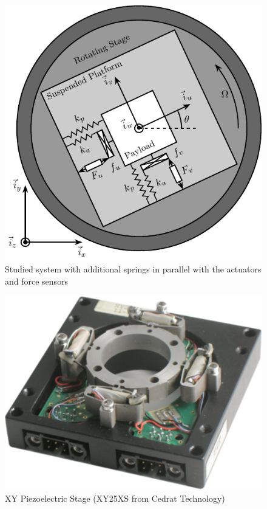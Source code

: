 \documentclass[10pt]{iopart}
\begin{document}
\begin{figure}[htbp]
\centering
\includegraphics[width=\linewidth]{figs/fig12.pdf}
\caption{\label{fig:system_parallel_springs}Studied system with additional springs in parallel with the actuators and force sensors}
\end{figure}


\begin{figure}[htbp]
\centering
\includegraphics[width=0.8\linewidth]{figs/fig13.pdf}
\caption{\label{fig:cedrat_xy25xs}XY Piezoelectric Stage (XY25XS from Cedrat Technology)}
\end{figure}
\end{document}
